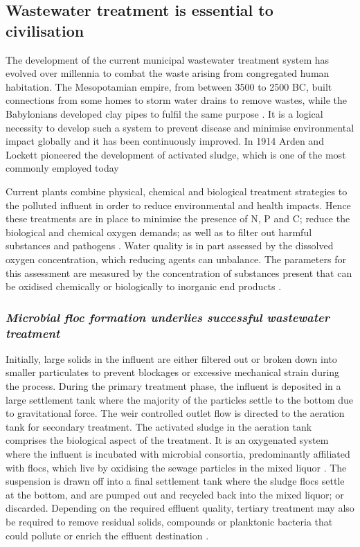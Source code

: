 \documentclass{article}
\begin{document}
\subsection{Wastewater treatment is essential to civilisation}
The development of the current municipal wastewater treatment system has evolved over millennia to combat the waste arising from congregated human habitation. The Mesopotamian empire, from between 3500 to 2500 BC, built connections from some homes to storm water drains to remove wastes, while the Babylonians developed clay pipes to fulfil the same purpose \cite{lofrano2010}. It is a logical necessity to develop such a system to prevent disease and minimise environmental impact globally and it has been continuously improved. In 1914 Arden and Lockett pioneered the development of activated sludge, which is one of the most commonly employed today \cite{jenkins2004manual,muchie2010bioremediation}


Current plants combine physical, chemical and biological treatment strategies to the polluted influent in order to reduce environmental and health impacts. Hence these treatments are in place to minimise the presence of N, P and C; reduce the biological and chemical oxygen demands; as well as to filter out harmful substances and pathogens \cite{mayhew1997low}.
Water quality is in part assessed by the dissolved oxygen concentration, which reducing agents can unbalance. The parameters for this assessment are measured by the concentration of substances present that can be oxidised chemically or biologically to inorganic end products \cite{pisarevsky2005chemical}.

\subsubsection{\emph{Microbial floc formation underlies successful wastewater treatment}}
Initially, large solids in the influent are either filtered out or broken down into smaller particulates to prevent blockages or excessive mechanical strain during the process. During the primary treatment phase, the influent is deposited in a large settlement tank where the majority of the particles settle to the bottom due to gravitational force. The weir controlled outlet flow is directed to the aeration tank for secondary treatment. The activated sludge in the aeration tank comprises the biological aspect of the treatment. It is an oxygenated system where the influent is incubated with microbial consortia, predominantly affiliated with flocs, which live by oxidising the sewage particles in the mixed liquor \cite{mayhew1997low}. The suspension is drawn off into a final settlement tank where the sludge flocs settle at the bottom, and are pumped out and recycled back into the mixed liquor; or discarded. Depending on the required effluent quality, tertiary treatment may also be required to remove residual solids, compounds or planktonic bacteria that could pollute or enrich the effluent destination \cite{Price_95}.
\end{document}
